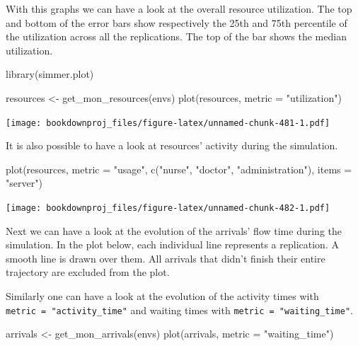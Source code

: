 \documentclass[
]{book}
\newenvironment{Shaded}{\begin{snugshade}}{\end{snugshade}}
\newcommand{\AttributeTok}[1]{\textcolor[rgb]{0.77,0.63,0.00}{#1}}
\newcommand{\FunctionTok}[1]{\textcolor[rgb]{0.00,0.00,0.00}{#1}}
\newcommand{\NormalTok}[1]{#1}
\newcommand{\OtherTok}[1]{\textcolor[rgb]{0.56,0.35,0.01}{#1}}
\newcommand{\StringTok}[1]{\textcolor[rgb]{0.31,0.60,0.02}{#1}}
\begin{document}
With this graphs we can have a look at the overall resource utilization. The top and bottom of the error bars show respectively the 25th and 75th percentile of the utilization across all the replications. The top of the bar shows the median utilization.

\begin{Shaded}
\begin{Highlighting}[]
\FunctionTok{library}\NormalTok{(simmer.plot)}

\NormalTok{resources }\OtherTok{\textless{}{-}} \FunctionTok{get\_mon\_resources}\NormalTok{(envs)}
\FunctionTok{plot}\NormalTok{(resources, }\AttributeTok{metric =} \StringTok{"utilization"}\NormalTok{)}
\end{Highlighting}
\end{Shaded}

\texttt{[image: bookdownproj\_files/figure-latex/unnamed-chunk-481-1.pdf]}

It is also possible to have a look at resources' activity during the simulation.

\begin{Shaded}
\begin{Highlighting}[]
\FunctionTok{plot}\NormalTok{(resources, }\AttributeTok{metric =} \StringTok{"usage"}\NormalTok{, }\FunctionTok{c}\NormalTok{(}\StringTok{"nurse"}\NormalTok{, }\StringTok{"doctor"}\NormalTok{, }\StringTok{"administration"}\NormalTok{), }\AttributeTok{items =} \StringTok{"server"}\NormalTok{)}
\end{Highlighting}
\end{Shaded}

\texttt{[image: bookdownproj\_files/figure-latex/unnamed-chunk-482-1.pdf]}

Next we can have a look at the evolution of the arrivals' flow time during the simulation. In the plot below, each individual line represents a replication. A smooth line is drawn over them. All arrivals that didn't finish their entire trajectory are excluded from the plot.

Similarly one can have a look at the evolution of the activity times with \texttt{metric\ =\ "activity\_time"} and waiting times with \texttt{metric\ =\ "waiting\_time"}.

\begin{Shaded}
\begin{Highlighting}[]
\NormalTok{arrivals }\OtherTok{\textless{}{-}} \FunctionTok{get\_mon\_arrivals}\NormalTok{(envs)}
\FunctionTok{plot}\NormalTok{(arrivals, }\AttributeTok{metric =} \StringTok{"waiting\_time"}\NormalTok{)}
\end{Highlighting}
\end{Shaded}
\end{document}
